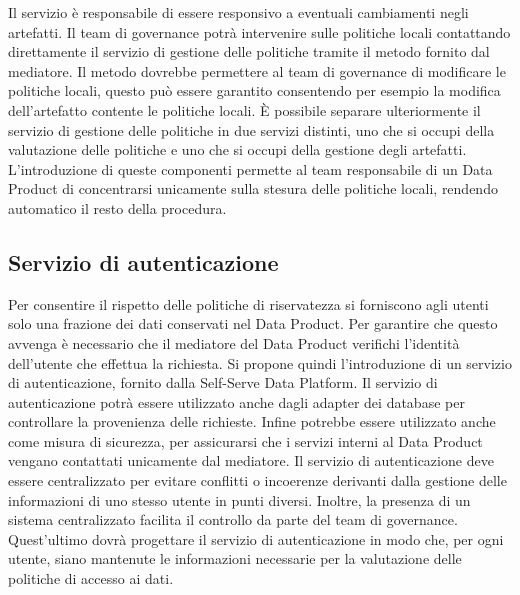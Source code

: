 \documentclass[a4paper,12pt]{report}
\begin{document}
Il servizio è responsabile di essere responsivo a eventuali cambiamenti negli artefatti.
Il team di governance potrà intervenire sulle politiche locali contattando direttamente il servizio di gestione delle politiche tramite il metodo fornito dal mediatore. 
Il metodo dovrebbe permettere al team di governance di modificare le politiche locali, questo può essere garantito consentendo per esempio la modifica dell'artefatto contente le politiche locali. 
È possibile separare ulteriormente il servizio di gestione delle politiche in due servizi distinti, uno che si occupi della valutazione delle politiche e uno che si occupi della gestione degli artefatti.
L'introduzione di queste componenti permette al team responsabile di un Data Product di concentrarsi unicamente sulla stesura delle politiche locali, rendendo automatico il resto della procedura.

\subsection{Servizio di autenticazione}
Per consentire il rispetto delle politiche di riservatezza si forniscono agli utenti solo una frazione dei dati conservati nel Data Product.
Per garantire che questo avvenga è necessario che il mediatore del Data Product verifichi l'identità dell'utente che effettua la richiesta.
Si propone quindi l'introduzione di un servizio di autenticazione, fornito dalla Self-Serve Data Platform.
Il servizio di autenticazione potrà essere utilizzato anche dagli adapter dei database per controllare la provenienza delle richieste.
Infine potrebbe essere utilizzato anche come misura di sicurezza, per assicurarsi che i servizi interni al Data Product vengano contattati unicamente dal mediatore.
Il servizio di autenticazione deve essere centralizzato per evitare conflitti o incoerenze derivanti dalla gestione delle informazioni di uno stesso utente in punti diversi.
Inoltre, la presenza di un sistema centralizzato facilita il controllo da parte del team di governance.
Quest'ultimo dovrà progettare il servizio di autenticazione in modo che, per ogni utente, siano mantenute le informazioni necessarie per la valutazione delle politiche di accesso ai dati.
\end{document}
